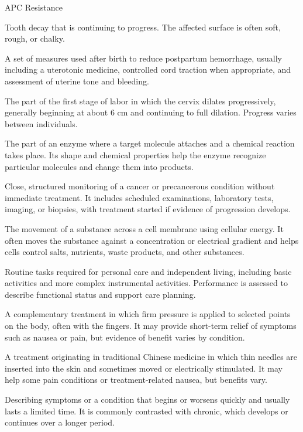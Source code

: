 \synonyms
APC Resistance

 Tooth decay that is continuing to progress. The affected surface is often soft, rough, or chalky.

 A set of measures used after birth to reduce postpartum hemorrhage, usually including a uterotonic
medicine, controlled cord traction when appropriate, and assessment of uterine tone and bleeding.

 The part of the first stage of labor in which the cervix dilates progressively, generally beginning at about 6 cm
and continuing to full dilation. Progress varies between individuals.

 The part of an enzyme where a target molecule attaches and a chemical reaction takes place. Its shape and chemical properties help the enzyme recognize particular molecules and change them into products.

 Close, structured monitoring of a cancer or precancerous condition without immediate
treatment. It includes scheduled examinations, laboratory tests, imaging, or biopsies,
with treatment started if evidence of progression develops.

 The movement of a substance across a cell membrane using cellular energy. It often moves the substance against a concentration or electrical gradient and helps cells control salts, nutrients, waste products, and other substances.

 Routine tasks required for personal care and independent living, including basic activities and
more complex instrumental activities. Performance is assessed to describe functional
status and support care planning.

 A complementary treatment in which firm pressure is applied to selected points on the body, often with the fingers. It may provide short-term relief of symptoms such as nausea or pain, but evidence of benefit varies by condition.

 A treatment originating in traditional Chinese medicine in which thin needles are inserted into the skin and sometimes moved or electrically stimulated. It may help some pain conditions or treatment-related nausea, but benefits vary.

 Describing symptoms or a condition that begins or worsens quickly and usually lasts a limited time. It is commonly contrasted with chronic, which develops or continues over a longer period.

